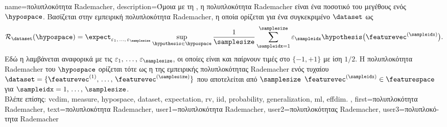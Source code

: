 {name={\foreignlanguage{greek}{πολυπλοκότητα} Rademacher},
 	description={\foreignlanguage{greek}{Όμοια με τη} 
		, \foreignlanguage{greek}{η πολυπλοκότητα} Rademacher 
		\cite{bartlett2002rademacher} \foreignlanguage{greek}{είναι ένα ποσοτικό}  
		\foreignlanguage{greek}{του μεγέθους ενός}  $\hypospace$. 
		\foreignlanguage{greek}{Βασίζεται στην εμπειρική πολυπλοκότητα} Rademacher, 
		\foreignlanguage{greek}{η οποία ορίζεται για ένα συγκεκριμένο}  
		$\dataset$ \foreignlanguage{greek}{ως}
		\begin{equation}
			\nonumber
    			\mathcal{R}_\dataset(\hypospace) 
    			= 
    			\expect_{\varepsilon_{1},\,\ldots,\,\varepsilon_{\samplesize} } 
			\sup_{\hypothesis \in \hypospace} \frac{1}{\samplesize} \sum_{\sampleidx=1}^\samplesize \varepsilon_\sampleidx 
			\hypothesis\big(\featurevec^{(\sampleidx)} \big).
    		\end{equation}
		\foreignlanguage{greek}{Εδώ η}  \foreignlanguage{greek}{λαμβάνεται αναφορικά με τις} 
		 \linebreak $\varepsilon_{1},\,\ldots,\,\varepsilon_{\samplesize}$,
		\foreignlanguage{greek}{οι οποίες είναι}  \foreignlanguage{greek}{και παίρνουν τιμές στο 
		$\{ -1, +1 \}$ με ίση}  $1/2$. \foreignlanguage{greek}{Η πολυπλοκότητα} Rademacher 
		\foreignlanguage{greek}{του $\hypospace$ ορίζεται τότε ως η}  
		\foreignlanguage{greek}{της εμπειρικής πολυπλοκότητας} Rademacher \foreignlanguage{greek}{ενός 
		τυχαίου}  $\dataset = \{\featurevec^{(1)}, \,\hdots, \,\featurevec^{(\samplesize)}\}$
		\foreignlanguage{greek}{που αποτελείται από} $\samplesize$   
		$\featurevec^{(\sampleidx)} \in \featurespace$ \foreignlanguage{greek}{για} $\sampleidx=1,\,\ldots,\,\samplesize$. 
		\\
        		\foreignlanguage{greek}{Βλέπε επίσης:} \gls{vcdim}, \gls{measure}, \gls{hypospace}, \gls{dataset}, 
		\gls{expectation}, \gls{rv}, \gls{iid}, \gls{probability}, \gls{generalization}, \gls{ml}, \gls{effdim}. },
	first={\foreignlanguage{greek}{πολυπλοκότητα} Rademacher},
	text={\foreignlanguage{greek}{πολυπλοκότητα} Rademacher},
	user1={\foreignlanguage{greek}{πολυπλοκότητα} Rademacher}, %
	user2={\foreignlanguage{greek}{πολυπλοκότητας} Rademacher}, %
	user3={\foreignlanguage{greek}{πολυπλοκότητα} Rademacher} %
}

